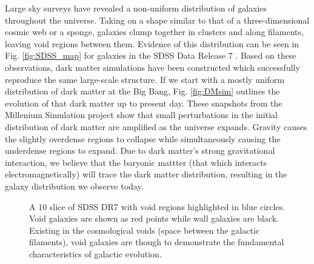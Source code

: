 Large sky surveys \citep[such as the Sloan Digital Sky Survey --- 
SDSS][]{York00} have revealed a non-uniform distribution of galaxies throughout 
the universe.  Taking on a shape similar to that of a three-dimensional cosmic 
web \citep{Bond96} or a sponge, galaxies clump together in clusters and along 
filaments, leaving void regions between them.  Evidence of this distribution can 
be seen in Fig. \ref{fig:SDSS_map} for galaxies in the SDSS Data Release 7 
\citep[SDSS DR7][]{Abazajian09}.  Based on these observations, dark matter 
simulations have been constructed which successfully reproduce the same 
large-scale structure.  If we start with a mostly uniform distribution of dark 
matter at the Big Bang, Fig. \ref{fig:DMsim} outlines the evolution of that dark 
matter up to present day.  These snapshots from the Millenium Simulation project 
\citep{Springel05} show that small perturbations in the initial distribution of 
dark matter are amplified as the universe expands.  Gravity causes the slightly 
overdense regions to collapse while simultaneously causing the underdense 
regions to expand.  Due to dark matter's strong gravitational interaction, we 
believe that the baryonic mattter (that which interacts electromagnetically) 
will trace the dark matter distribution, resulting in the galaxy distribution we 
observe today.


\begin{figure}
    \caption[Sky map highlighting voids and void galaxies]{A 10 \hMpc slice of 
    SDSS DR7 \citep[Fig. 1]{Moorman14} with void regions highlighted in blue 
    circles.  Void galaxies are shown as red points while wall galaxies are 
    black.  Existing in the cosmological voids (space between the galactic 
    filaments), void galaxies are though to demonstrate the fundamental 
    characteristics of galactic evolution.}
\end{figure}

